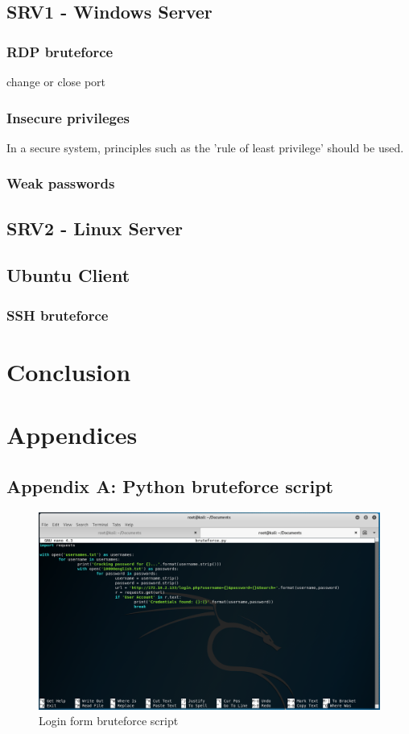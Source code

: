 \documentclass{report}
\begin{document}
\section{SRV1 - Windows Server}
\subsection{RDP bruteforce}
	change or close port
\subsection{Insecure privileges}
In a secure system, principles such as the 'rule of least privilege' should be used.
\subsection{Weak passwords}

\section{SRV2 - Linux Server}

\section{Ubuntu Client}
\subsection{SSH bruteforce}

\chapter{Conclusion}

\chapter{Appendices}
\section{Appendix A: Python bruteforce script}
\begin{figure}[!htb]
	\centering
	\includegraphics[scale=0.4]{img/bruteforcescript.png}
	\caption{Login form bruteforce script}
\end{figure}
\end{document}
